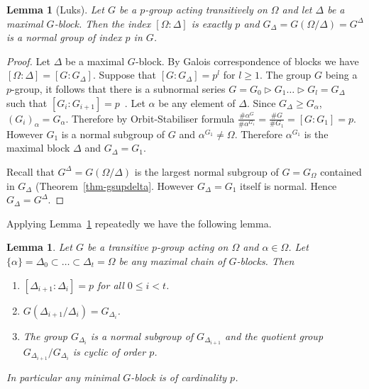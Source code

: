 \documentclass[11pt]{madras}%
\newtheorem{lemma}[theorem]{Lemma}
\theoremstyle{remark}
\newcommand{\Gof}[2][G]{{\ensuremath{#1\left(#2\right)}}}
\begin{document}
\begin{lemma}[Luks]\label{lem-luks-pgroups}
  Let $G$ be a $p$-group acting transitively on $\Omega$ and let
  $\Delta$ be a maximal $G$-block. Then the index $[\Omega : \Delta]$
  is exactly $p$ and $G_\Delta = \Gof{\Omega/\Delta}=G^{\Delta}$ is a
  normal group of index $p$ in $G$.
\end{lemma}
\begin{proof}
  Let $\Delta$ be a maximal $G$-block. By Galois correspondence of
  blocks we have $[ \Omega : \Delta] = [ G : G_\Delta]$. Suppose that
  $[G: G_\Delta] = p^l$ for $l \geq 1$. The group $G$ being a
  $p$-group, it follows that there is a subnormal series $G = G_ 0
  \rhd G_1 \ldots \rhd G_l = G_\Delta$ such that $[G_i : G_{i+1} ] =
  p$~\cite[Theorem~4.3.2]{hall}.  Let $\alpha$ be any element of
  $\Delta$. Since $G_\Delta \geq G_\alpha$, ${(G_i)}_\alpha =
  G_\alpha$.  Therefore by Orbit-Stabiliser formula $\frac{\#
    \alpha^{G}}{\# \alpha^{G_1}} = \frac{\# G}{\#G_1} = [G : G_1] =
  p$. However $G_1$ is a normal subgroup of $G$ and $\alpha^{G_1} \neq
  \Omega$.  Therefore $\alpha^{G_1}$ is the maximal block $\Delta$ and
  $G_\Delta = G_1$.

  Recall that $G^\Delta = \Gof{\Omega/\Delta}$ is the largest normal
  subgroup of $G = G_\Omega$ contained in $G_\Delta$
  (Theorem~\ref{thm-gsupdelta}. However $G_\Delta = G_1$ itself is
  normal. Hence $G_\Delta = G^\Delta$.
\end{proof}

 Applying Lemma~\ref{lem-luks-pgroups} repeatedly we have the
 following lemma.

 \begin{lemma}\label{lem-struct-pgroups}
   Let $G$ be a transitive $p$-group acting on $\Omega$ and
   $\alpha \in \Omega$. Let $\{ \alpha \} = \Delta_0 \subset \ldots
   \subset \Delta_t = \Omega$ be any maximal chain of $G$-blocks.
   Then
   \begin{enumerate}
   \item $[\Delta_{i+1}: \Delta_i] = p$ for all $0 \leq i < t$.
   \item $\Gof{\Delta_{i+1}/\Delta_i} = G_{\Delta_i}$.
   \item The group $G_{\Delta_i}$ is a normal subgroup of
     $G_{\Delta_{i+1}}$ and the quotient group
     $G_{\Delta_{i+1}}/G_{\Delta_i}$ is cyclic of order $p$.
   \end{enumerate}
   In particular any minimal $G$-block is of cardinality $p$.
 \end{lemma}
\end{document}
